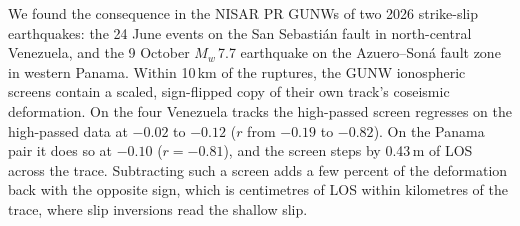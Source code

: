 We found the consequence in the NISAR PR GUNWs of two 2026 strike-slip earthquakes: the 24 June events on the San
Sebastián fault in north-central Venezuela, and the 9 October $M_w$\,7.7 earthquake on the Azuero--Son\'a fault zone
in western Panama. Within 10\,km of the ruptures, the GUNW ionospheric screens contain a scaled, sign-flipped copy
of their own track's coseismic deformation. On the four Venezuela tracks the high-passed screen regresses on the high-passed data at $-0.02$ to $-0.12$
($r$ from $-0.19$ to $-0.82$). On the Panama pair it does so at $-0.10$ ($r=-0.81$), and the screen steps by 0.43\,m
of LOS across the trace. Subtracting such a screen adds a few percent of the
deformation back with the opposite sign, which is centimetres of LOS within kilometres of the trace, where slip
inversions read the shallow slip.

